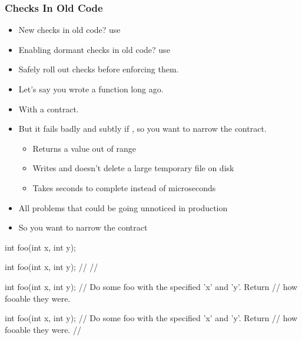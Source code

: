 \begin{frame}[fragile]
  \frametitle{Checks In Old Code}
  \begin{itemize}\pause
  \item{New checks in old code?  use } \pause
  \item{Enabling dormant checks in old code?  use } \pause
  \end{itemize}
  \begin{itemize}
  \item{Safely roll out checks before enforcing them.}
  \end{itemize}
\end{frame}

\begin{frame}[fragile]
  \begin{overprint}
  \begin{itemize}
  \item<1->{Let's say you wrote a function long ago.}
  \item<3->{With a contract.}
  \item<5->{But it fails badly and subtly if , so you want to narrow the contract.}
    \begin{itemize}
    \item<6->{Returns a value out of range}
    \item<7->{Writes and doesn't delete a large temporary file on disk}
    \item<8->{Takes seconds to complete instead of microseconds}
    \end{itemize}
  \item<9->{All problems that could be going unnoticed in production}
  \item<10->{So you want to narrow the contract}
  \end{itemize}
\end{overprint}

\begin{overprint}
\begin{cppcodebox}
int foo(int x, int y);
\end{cppcodebox}

\begin{cppcodebox}
int foo(int x, int y);
  // 
  // 
\end{cppcodebox}

\begin{cppcodebox}
int foo(int x, int y);
  // Do some foo with the specified 'x' and 'y'.  Return
  // how fooable they were.
\end{cppcodebox}

\begin{cppcodebox}
int foo(int x, int y);
  // Do some foo with the specified 'x' and 'y'.  Return
  // how fooable they were. 
  // 
\end{cppcodebox}

\end{overprint}
\end{frame}

